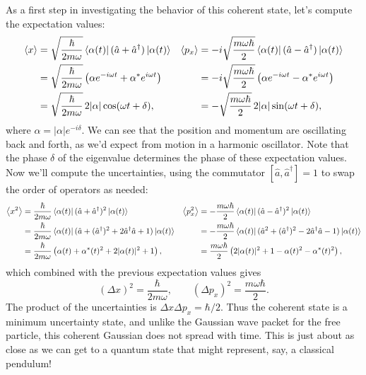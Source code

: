 \documentclass[../p116main.tex]{subfiles}
\begin{document}
As a first step in investigating the behavior of this coherent state, let's compute the expectation values:
\begin{align*}
    \left< x \right> &= \sqrt{\frac{\hbar}{2m\omega}} \left< \alpha(t) \right| (\hat a + \hat a^\dagger) \left| \alpha(t) \right> & \left< p_x \right> &= -i\sqrt{\frac{m\omega\hbar}{2}} \left< \alpha(t) \right| (\hat a - \hat a^\dagger) \left| \alpha(t) \right> \\
    &= \sqrt{\frac{\hbar}{2m\omega}} \left( \alpha e^{-i\omega t} + \alpha^* e^{i\omega t} \right) &&= -i\sqrt{\frac{m\omega\hbar}{2}} \left( \alpha e^{-i \omega t} - \alpha^* e^{i\omega t} \right) \\
    &= \sqrt{\frac{\hbar}{2m\omega}} \, 2|\alpha| \cos (\omega t + \delta), &&= -\sqrt{\frac{m\omega\hbar}{2}} \, 2|\alpha| \sin (\omega t + \delta),
\end{align*}
where $\alpha = |\alpha| e^{-i\delta}$.
We can see that the position and momentum are oscillating back and forth, as we'd expect from motion in a harmonic oscillator.
Note that the phase $\delta$ of the eigenvalue determines the phase of these expectation values.
Now we'll compute the uncertainties, using the commutator $[\hat a, \hat a^\dagger] = 1$ to swap the order of operators as needed:
\begin{align*}
    \left< x^2 \right> &= \frac{\hbar}{2m\omega} \left< \alpha(t) \right| (\hat a + \hat a^\dagger)^2 \left| \alpha(t) \right> & \left< p_x^2 \right> &= -\frac{m\omega \hbar}{2} \left< \alpha(t) \right| (\hat a - \hat a^\dagger)^2 \left| \alpha(t) \right> \\
    &= \frac{\hbar}{2m\omega} \left< \alpha(t) \right| (\hat a + (\hat a^\dagger)^2 + 2 \hat a^\dagger \hat a + 1) \left| \alpha(t) \right> &&= -\frac{m\omega\hbar}{2} \left< \alpha(t) \right| (\hat a^2 + (\hat a^\dagger)^2 - 2\hat a^\dagger \hat a - 1) \left| \alpha(t) \right> \\
    &= \frac{\hbar}{2m\omega} \left( \alpha(t) + \alpha^*(t)^2 + 2|\alpha(t)|^2 + 1 \right), &&= \frac{m\omega\hbar}{2} \left( 2|\alpha(t)|^2 + 1 - \alpha(t)^2 - \alpha^*(t)^2 \right),
\end{align*}
which combined with the previous expectation values gives
\[ (\Delta x)^2 = \frac{\hbar}{2m\omega}, \qquad (\Delta p_x)^2 = \frac{m\omega\hbar}{2}. \]
The product of the uncertainties is $\Delta x \Delta p_x = \hbar / 2$.
Thus the coherent state is a minimum uncertainty state, and unlike the Gaussian wave packet for the free particle, this coherent Gaussian does not spread with time.
This is just about as close as we can get to a quantum state that might represent, say, a classical pendulum!
\end{document}
